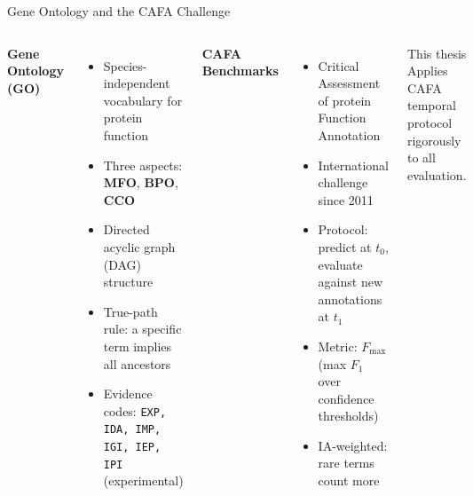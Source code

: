 \documentclass[12pt, aspectratio=169]{beamer}
\newcommand{\fmax}{$F_{\max}$}
\begin{document}
\begin{frame}{Gene Ontology and the CAFA Challenge}
  \begin{columns}[t]
      \textbf{Gene Ontology (GO)}
      \begin{itemize}
        \item Species-independent vocabulary for protein function
        \item Three aspects: \textbf{MFO}, \textbf{BPO}, \textbf{CCO}
        \item Directed acyclic graph (DAG) structure
        \item True-path rule: a specific term implies all ancestors
        \item Evidence codes: \texttt{EXP, IDA, IMP, IGI, IEP, IPI} (experimental)
      \end{itemize}
      \textbf{CAFA Benchmarks}
      \begin{itemize}
        \item Critical Assessment of protein Function Annotation
        \item International challenge since 2011
        \item Protocol: predict at $t_0$, evaluate against new annotations at $t_1$
        \item Metric: \fmax{} (max $F_1$ over confidence thresholds)
        \item IA-weighted: rare terms count more
      \end{itemize}
      \vspace{0.5em}
      \begin{block}{This thesis}
        Applies CAFA temporal protocol rigorously to all evaluation.
      \end{block}
  \end{columns}
\end{frame}
\end{document}
